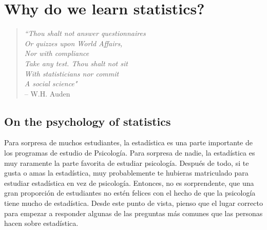 


\chapter{Why do we learn statistics?~\label{ch:whystats}}


\begin{verse}{\it
``Thou shalt not answer questionnaires \\
Or quizzes upon World Affairs, \\
\hspace*{.5cm}    Nor with compliance \\
Take any test. Thou shalt not sit  \\
With statisticians nor commit \\
\hspace*{.5cm}    A social science" }\vspace*{6pt} \\ 
\hspace*{2cm} -- W.H. Auden
\end{verse}
\vspace*{12pt}


\section{On the psychology of statistics~\label{sec:whywhywhy}}

Para sorpresa de muchos estudiantes, la estadística es una parte importante de 
los programas de estudio de Psicología. Para sorpresa de nadie, la estadística 
es muy raramente la parte favorita de estudiar psicología. Después de todo, si 
te gusta o amas la estadística, muy probablemente te hubieras matriculado para 
estudiar estadística en vez de psicología. Entonces, no es sorprendente, que una
gran proporción de estudiantes no estén felices con el hecho de que la psicología
tiene mucho de estadística.  Desde este punto de vista, pienso que el lugar 
correcto para empezar a responder algunas de las preguntas más comunes que las 
personas hacen sobre estadística. 
 
